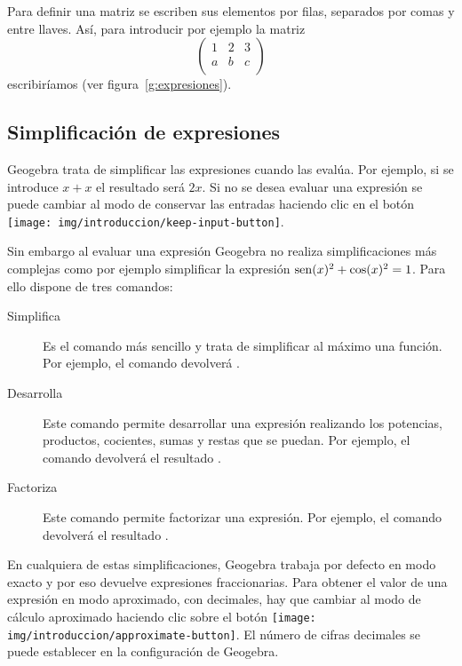 Para definir una matriz se escriben sus elementos por filas, separados por comas y entre llaves.
Así, para introducir por ejemplo la matriz
\[
\left(
\begin{array}{ccc}
1 & 2 & 3 \\
a & b & c \\
\end{array}
\right)
\]
escribiríamos  (ver figura~\ref{g:expresiones}).


\subsection*{Simplificación de expresiones}
Geogebra trata de simplificar las expresiones cuando las evalúa.
Por ejemplo, si se introduce $x+x$ el resultado será $2x$.
Si no se desea evaluar una expresión se puede cambiar al modo de conservar las entradas haciendo clic en el botón \texttt{[image: img/introduccion/keep-input-button]}.

Sin embargo al evaluar una expresión Geogebra no realiza simplificaciones más complejas como por ejemplo simplificar la expresión $\operatorname{sen}(x)^2+\cos(x)^2=1$.
Para ello dispone de tres comandos:
\begin{description}
\item[Simplifica] Es el comando más sencillo y trata de simplificar al máximo una función.
      Por ejemplo, el comando  devolverá .
\item[Desarrolla] Este comando permite desarrollar una expresión realizando los potencias, productos, cocientes, sumas y restas que se puedan.
      Por ejemplo, el comando  devolverá el resultado .
\item[Factoriza] Este comando permite factorizar una expresión.
      Por ejemplo, el comando  devolverá el resultado .
\end{description}

En cualquiera de estas simplificaciones, Geogebra trabaja por defecto en modo exacto y por eso devuelve expresiones fraccionarias.
Para obtener el valor de una expresión en modo aproximado, con decimales, hay que cambiar al modo de cálculo aproximado haciendo clic sobre el botón \texttt{[image: img/introduccion/approximate-button]}.
El número de cifras decimales se puede establecer en la configuración de Geogebra.

